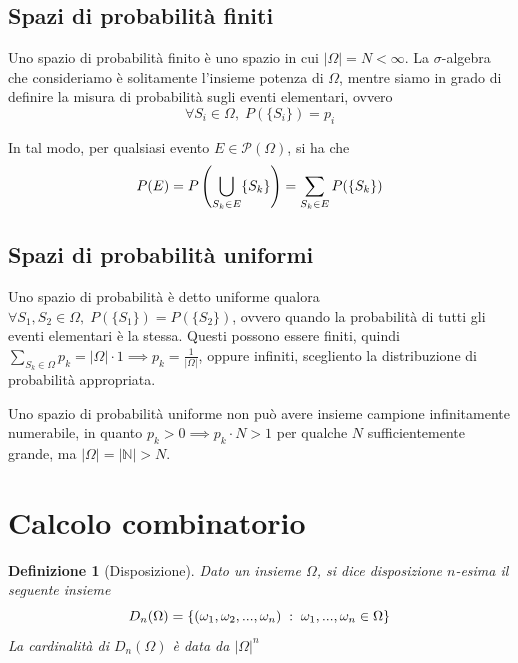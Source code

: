 \documentclass{article}
\newtheorem{definition}{Definizione}
\begin{document}
        \subsection{Spazi di probabilità finiti}
            Uno spazio di probabilità finito è uno spazio in cui $|\Omega| = N < \infty$. 
            La $\sigma$-algebra che consideriamo è solitamente l'insieme potenza di $\Omega$, mentre siamo in grado di definire la misura di probabilità sugli eventi elementari, ovvero
            \[
                \forall S_{i} \in \Omega, \; P(\{S_{i}\}) = p_{i}
            \]

            In tal modo, per qualsiasi evento $E \in \mathcal{P}(\Omega)$, si ha che
            \[
                P(E) = P\qty(\bigcup_{S_{k} \in E} \{S_{k}\}) = \sum_{S_{k} \in E} P(\{S_{k}\})
            \]

        \subsection{Spazi di probabilità uniformi}
            Uno spazio di probabilità è detto uniforme qualora $\forall S_{1}, S_{2} \in \Omega, \; P(\{S_{1}\}) = P(\{S_{2}\})$, ovvero quando la probabilità di tutti gli eventi elementari è la stessa.
            Questi possono essere finiti, quindi $\sum_{S_{k} \in \Omega} p_{k} = |\Omega| \cdot 1 \implies p_{k} = \frac{1}{|\Omega|}$, oppure infiniti, scegliento la distribuzione di probabilità appropriata.

            \vspace{10pt}
            Uno spazio di probabilità uniforme non può avere insieme campione infinitamente numerabile, in quanto $p_{k} > 0 \implies p_{k} \cdot N > 1$ per qualche $N$ sufficientemente grande, ma $|\Omega| = |\mathbb{N}| > N$.



    \newpage
    \section{Calcolo combinatorio}
        \begin{definition}[Disposizione]
            Dato un insieme $\Omega$, si dice disposizione $n$-esima il seguente insieme
            \[
                D_{n}(\Omega) = \qty{ (\omega_{1}, \omega_{2}, ..., \omega_{n}) \; : \; \omega_{1}, ..., \omega_{n} \in \Omega }
            \]
            La cardinalità di $D_{n}(\Omega)$ è data da $|\Omega|^{n}$
        \end{definition}
\end{document}
